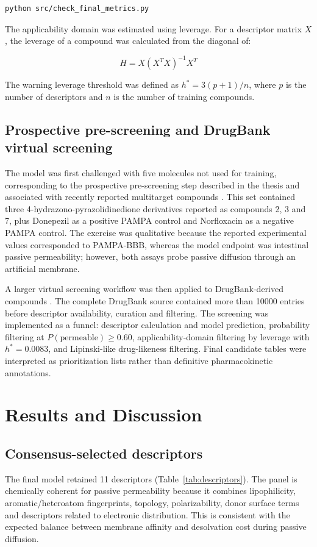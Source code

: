 \documentclass[11pt]{article}
\begin{document}
\begin{verbatim}
python src/check_final_metrics.py
\end{verbatim}

The applicability domain was estimated using leverage. For a descriptor matrix \(X\), the leverage of a compound was calculated from the diagonal of:

\[
H = X(X^TX)^{-1}X^T
\]

The warning leverage threshold was defined as \(h^* = 3(p+1)/n\), where \(p\) is the number of descriptors and \(n\) is the number of training compounds.

\subsection{Prospective pre-screening and DrugBank virtual screening}
The model was first challenged with five molecules not used for training, corresponding to the prospective pre-screening step described in the thesis and associated with recently reported multitarget compounds \cite{Waheed2026}. This set contained three 4-hydrazono-pyrazolidinedione derivatives reported as compounds 2, 3 and 7, plus Donepezil as a positive PAMPA control and Norfloxacin as a negative PAMPA control. The exercise was qualitative because the reported experimental values corresponded to PAMPA-BBB, whereas the model endpoint was intestinal passive permeability; however, both assays probe passive diffusion through an artificial membrane.

A larger virtual screening workflow was then applied to DrugBank-derived compounds \cite{Wishart2018}. The complete DrugBank source contained more than 10000 entries before descriptor availability, curation and filtering. The screening was implemented as a funnel: descriptor calculation and model prediction, probability filtering at \(P(\mathrm{permeable}) \geq 0.60\), applicability-domain filtering by leverage with \(h^* = 0.0083\), and Lipinski-like drug-likeness filtering. Final candidate tables were interpreted as prioritization lists rather than definitive pharmacokinetic annotations.

\section{Results and Discussion}
\subsection{Consensus-selected descriptors}
The final model retained 11 descriptors (Table~\ref{tab:descriptors}). The panel is chemically coherent for passive permeability because it combines lipophilicity, aromatic/heteroatom fingerprints, topology, polarizability, donor surface terms and descriptors related to electronic distribution. This is consistent with the expected balance between membrane affinity and desolvation cost during passive diffusion.
\end{document}
